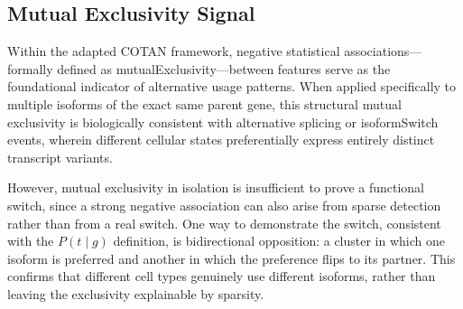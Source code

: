 \subsection{Mutual Exclusivity Signal}\label{sec:mutual-exclusivity}

Within the adapted COTAN framework, negative statistical associations---formally defined as \gls{mutualExclusivity}---between features serve as the foundational indicator of alternative usage patterns. When applied specifically to multiple isoforms of the exact same parent gene, this structural mutual exclusivity is biologically consistent with alternative splicing or \gls{isoformSwitch} events, wherein different cellular states preferentially express entirely distinct transcript variants.

However, mutual exclusivity in isolation is insufficient to prove a functional switch, since a strong negative association can also arise from sparse detection rather than from a real switch. One way to demonstrate the switch, consistent with the $P(t \mid g)$ definition, is bidirectional opposition: a cluster in which one isoform is preferred and another in which the preference flips to its partner. This confirms that different cell types genuinely use different isoforms, rather than leaving the exclusivity explainable by sparsity.
